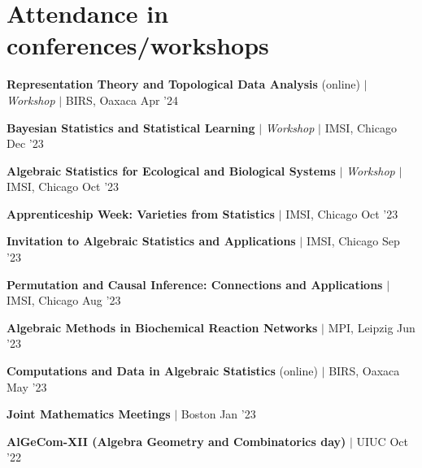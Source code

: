 \section{Attendance in conferences/workshops}
\resumeSubHeadingListStart

\resumeProjectHeading
{\color{grey}\textbf{Representation Theory and Topological Data Analysis} (online) $|$ \textit{Workshop} $|$ BIRS, Oaxaca}
{Apr '24}
{}
\vspace{-20pt}

\resumeProjectHeading
{\color{grey}\textbf{Bayesian Statistics and Statistical Learning} $|$ \textit{Workshop} $|$ IMSI, Chicago}
{Dec '23}
{}
\vspace{-20pt}

\resumeProjectHeading
{\textbf{Algebraic Statistics for Ecological and Biological Systems} $|$ \textit{Workshop}  $|$ IMSI, Chicago}
{Oct '23}
{}
\vspace{-20pt}

\resumeProjectHeading
{\textbf{Apprenticeship Week: Varieties from Statistics} $|$ IMSI, Chicago}
{{Oct '23}}
{}
\vspace{-20pt}

\resumeProjectHeading
{\textbf{Invitation to Algebraic Statistics and Applications}   $|$ IMSI, Chicago}
{{Sep '23}}
{}
\vspace{-20pt}

\resumeProjectHeading
{\textbf{Permutation and Causal Inference: Connections and Applications} $|$ IMSI, Chicago}
{{Aug '23}}
{}
\vspace{-20pt}

\resumeProjectHeading
{\textbf{Algebraic Methods in Biochemical Reaction Networks}  $|$ MPI, Leipzig}
{{Jun '23}}
{}
\vspace{-20pt}

\resumeProjectHeading
{\textbf{Computations and Data in Algebraic Statistics} (online) $|$ BIRS, Oaxaca}
{May '23}
{}
\vspace{-20pt}

\resumeProjectHeading
{\textbf{Joint Mathematics Meetings}   $|$ Boston }
{Jan '23}
{}
\vspace{-20pt}

\resumeProjectHeading
{\textbf{AlGeCom-XII (Algebra Geometry and Combinatorics day)}  $|$ UIUC}
{Oct '22}
{}


